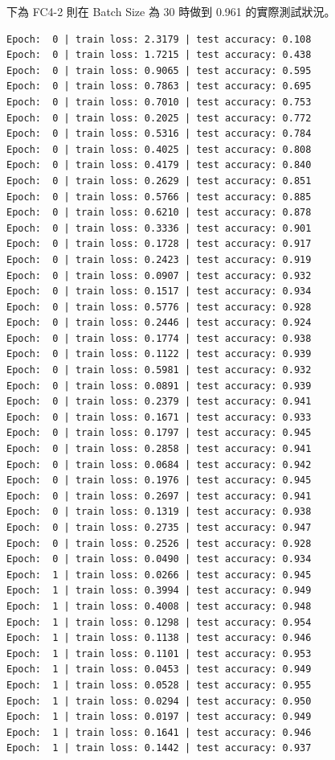 \documentclass[11pt,UTF8]{ctexart}
\begin{document}
下為 FC4-2 則在 Batch Size 為 30 時做到 0.961 的實際測試狀況。

\begin{verbatim}
Epoch:  0 | train loss: 2.3179 | test accuracy: 0.108
Epoch:  0 | train loss: 1.7215 | test accuracy: 0.438
Epoch:  0 | train loss: 0.9065 | test accuracy: 0.595
Epoch:  0 | train loss: 0.7863 | test accuracy: 0.695
Epoch:  0 | train loss: 0.7010 | test accuracy: 0.753
Epoch:  0 | train loss: 0.2025 | test accuracy: 0.772
Epoch:  0 | train loss: 0.5316 | test accuracy: 0.784
Epoch:  0 | train loss: 0.4025 | test accuracy: 0.808
Epoch:  0 | train loss: 0.4179 | test accuracy: 0.840
Epoch:  0 | train loss: 0.2629 | test accuracy: 0.851
Epoch:  0 | train loss: 0.5766 | test accuracy: 0.885
Epoch:  0 | train loss: 0.6210 | test accuracy: 0.878
Epoch:  0 | train loss: 0.3336 | test accuracy: 0.901
Epoch:  0 | train loss: 0.1728 | test accuracy: 0.917
Epoch:  0 | train loss: 0.2423 | test accuracy: 0.919
Epoch:  0 | train loss: 0.0907 | test accuracy: 0.932
Epoch:  0 | train loss: 0.1517 | test accuracy: 0.934
Epoch:  0 | train loss: 0.5776 | test accuracy: 0.928
Epoch:  0 | train loss: 0.2446 | test accuracy: 0.924
Epoch:  0 | train loss: 0.1774 | test accuracy: 0.938
Epoch:  0 | train loss: 0.1122 | test accuracy: 0.939
Epoch:  0 | train loss: 0.5981 | test accuracy: 0.932
Epoch:  0 | train loss: 0.0891 | test accuracy: 0.939
Epoch:  0 | train loss: 0.2379 | test accuracy: 0.941
Epoch:  0 | train loss: 0.1671 | test accuracy: 0.933
Epoch:  0 | train loss: 0.1797 | test accuracy: 0.945
Epoch:  0 | train loss: 0.2858 | test accuracy: 0.941
Epoch:  0 | train loss: 0.0684 | test accuracy: 0.942
Epoch:  0 | train loss: 0.1976 | test accuracy: 0.945
Epoch:  0 | train loss: 0.2697 | test accuracy: 0.941
Epoch:  0 | train loss: 0.1319 | test accuracy: 0.938
Epoch:  0 | train loss: 0.2735 | test accuracy: 0.947
Epoch:  0 | train loss: 0.2526 | test accuracy: 0.928
Epoch:  0 | train loss: 0.0490 | test accuracy: 0.934
Epoch:  1 | train loss: 0.0266 | test accuracy: 0.945
Epoch:  1 | train loss: 0.3994 | test accuracy: 0.949
Epoch:  1 | train loss: 0.4008 | test accuracy: 0.948
Epoch:  1 | train loss: 0.1298 | test accuracy: 0.954
Epoch:  1 | train loss: 0.1138 | test accuracy: 0.946
Epoch:  1 | train loss: 0.1101 | test accuracy: 0.953
Epoch:  1 | train loss: 0.0453 | test accuracy: 0.949
Epoch:  1 | train loss: 0.0528 | test accuracy: 0.955
Epoch:  1 | train loss: 0.0294 | test accuracy: 0.950
Epoch:  1 | train loss: 0.0197 | test accuracy: 0.949
Epoch:  1 | train loss: 0.1641 | test accuracy: 0.946
Epoch:  1 | train loss: 0.1442 | test accuracy: 0.937

\end{verbatim}
\end{document}
